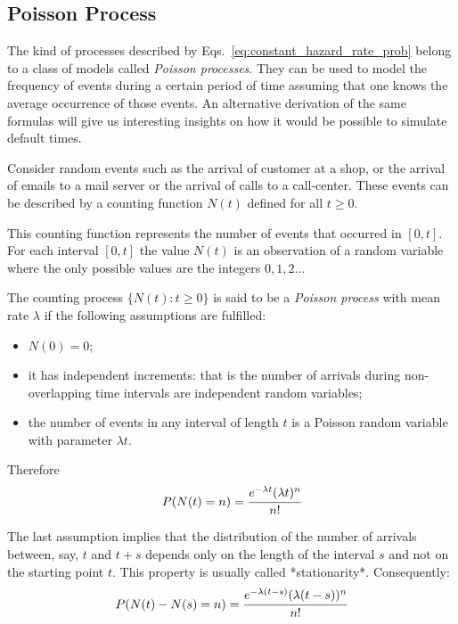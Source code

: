 \subsection{Poisson Process}
\label{sec:poisson_process}
The kind of processes described by Eqs.~\ref{eq:constant_hazard_rate_prob} belong to a class of models called \emph{Poisson processes}. 
They can be used to model the frequency of events during a certain period of time assuming that one knows the average occurrence of those events. An alternative derivation of the same formulas will give us interesting insights on how it would be possible to simulate default times.

Consider random events such as the arrival of customer at a shop, or the arrival of emails to a mail server or the arrival of calls to a call-center. These events can be described by a counting function $N(t)$ defined for all $t\ge 0$.

This counting function represents the number of events that occurred in $[0, t]$. For each interval $[0,t]$ the value $N(t)$ is an observation of a random variable where the only possible values are the integers $0, 1, 2\ldots$

The counting process $\{N(t):t\ge 0\}$ is said to be a \emph{Poisson process} with mean rate $\lambda$ if the following assumptions are fulfilled:
\begin{itemize}
\item $N(0)=0$;
\item it has independent increments: that is the number of arrivals during non-overlapping time intervals are independent random variables;
\item the number of events in any interval of length $t$ is a Poisson random variable with parameter $\lambda t$.
\end{itemize}

Therefore
\begin{equation}
P(N(t)=n)=\cfrac{e^{-\lambda t}(\lambda t)^n}{n!}
\label{eq:poisson_pdf}
\end{equation}

The last assumption implies that the distribution of the number of arrivals between, say, $t$ and $t+s$ depends only on the length of the interval $s$ and not on the starting point $t$. This property is usually called *stationarity*. Consequently:
\begin{equation}
P(N(t)-N(s)=n)=\cfrac{e^{-\lambda (t-s)}(\lambda (t-s))^n}{n!}
\end{equation}

